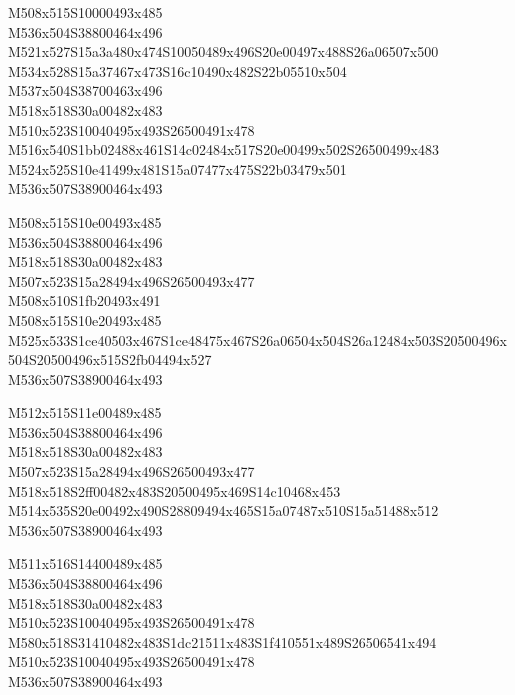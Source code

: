 \documentclass{article}
\begin{document}
\begin{multicols}{5}
\begin{center}

M508x515S10000493x485 %
\\M536x504S38800464x496 %
\\M521x527S15a3a480x474S10050489x496S20e00497x488S26a06507x500 %
\\M534x528S15a37467x473S16c10490x482S22b05510x504 %
\\M537x504S38700463x496 %
\\M518x518S30a00482x483 %
\\M510x523S10040495x493S26500491x478 %
\\M516x540S1bb02488x461S14c02484x517S20e00499x502S26500499x483 %
\\M524x525S10e41499x481S15a07477x475S22b03479x501 %
\\M536x507S38900464x493 %
\vfil
\columnbreak

M508x515S10e00493x485 %
\\M536x504S38800464x496 %
\\M518x518S30a00482x483 %
\\M507x523S15a28494x496S26500493x477 %
\\M508x510S1fb20493x491 %
\\M508x515S10e20493x485 %
\\M525x533S1ce40503x467S1ce48475x467S26a06504x504S26a12484x503S20500496x504S20500496x515S2fb04494x527 %
\\M536x507S38900464x493 %
\vfil
\columnbreak

M512x515S11e00489x485 %
\\M536x504S38800464x496 %
\\M518x518S30a00482x483 %
\\M507x523S15a28494x496S26500493x477 %
\\M518x518S2ff00482x483S20500495x469S14c10468x453 %
\\M514x535S20e00492x490S28809494x465S15a07487x510S15a51488x512 %
\\M536x507S38900464x493 %
\vfil
\columnbreak

M511x516S14400489x485 %
\\M536x504S38800464x496 %
\\M518x518S30a00482x483 %
\\M510x523S10040495x493S26500491x478 %
\\M580x518S31410482x483S1dc21511x483S1f410551x489S26506541x494 %
\\M510x523S10040495x493S26500491x478 %
\\M536x507S38900464x493 %
\vfil
\columnbreak


\end{center}
\end{multicols}
\end{document}
